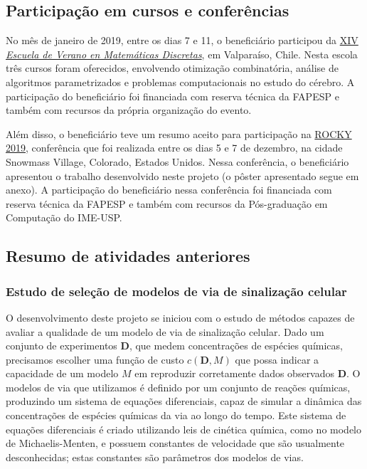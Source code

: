 \documentclass[12pt]{article}
\begin{document}
\subsection{Participação em cursos e conferências}
No mês de janeiro de 2019, entre os dias 7 e 11, o beneficiário participou da \href{http://eventos.cmm.uchile.cl/discretas2019/}{XIV {\em Escuela de Verano en Matemáticas Discretas}}, em  Valparaíso, Chile. Nesta escola três cursos foram oferecidos, envolvendo
otimização combinatória, análise de algoritmos parametrizados e problemas computacionais no estudo do cérebro. A participação do beneficiário foi financiada com reserva técnica da FAPESP e também com recursos da própria organização do evento.

Além disso, o beneficiário teve um resumo aceito para participação na \href{https://www.iscb.org/rocky2019}{ROCKY 2019}, conferência que foi realizada entre os dias 5 e 7 de dezembro, na cidade Snowmass Village, Colorado, Estados Unidos. Nessa conferência, o beneficiário apresentou o trabalho desenvolvido neste projeto (o pôster apresentado segue em anexo). A participação do beneficiário nessa conferência foi financiada com reserva técnica da FAPESP e também com recursos da Pós-graduação em Computação do IME-USP.

\subsection{Resumo de atividades anteriores}
\subsubsection{Estudo de seleção de modelos de via de sinalização celular}
O desenvolvimento deste projeto se iniciou com o estudo de métodos
capazes de avaliar a qualidade de um modelo de via de sinalização 
celular. Dado um conjunto de experimentos $\mathbf{D}$, que medem
concentrações de espécies químicas, precisamos escolher uma função de
custo $c (\mathbf{D}, M)$ que possa indicar a capacidade de um modelo
$M$ em reproduzir corretamente dados observados $\mathbf{D}$. O modelos
de via que utilizamos é definido por um conjunto de reações químicas,
produzindo um sistema de equações diferenciais, capaz de simular a
dinâmica das concentrações de espécies químicas da via ao longo do
tempo. Este sistema de equações diferenciais é criado utilizando leis de
cinética química, como no modelo de Michaelis-Menten, e possuem
constantes de velocidade que são usualmente desconhecidas; estas
constantes são parâmetros dos modelos de vias.
\end{document}
